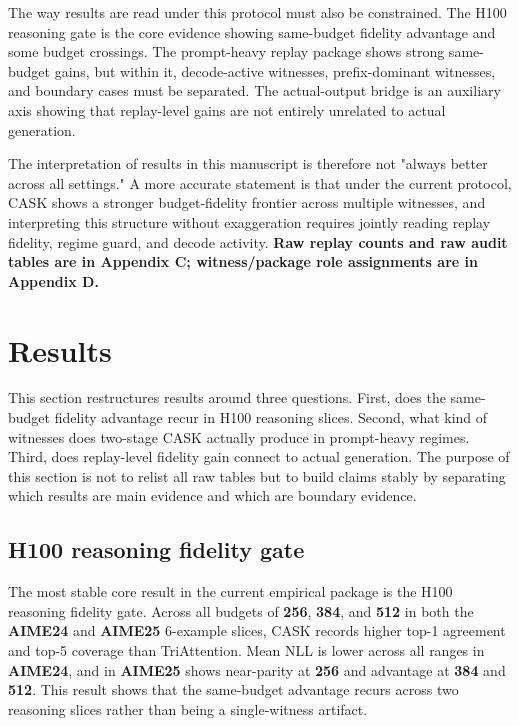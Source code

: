 The way results are read under this protocol must also be constrained. The H100 reasoning gate is the core evidence showing same-budget fidelity advantage and some budget crossings. The prompt-heavy replay package shows strong same-budget gains, but within it, decode-active witnesses, prefix-dominant witnesses, and boundary cases must be separated. The actual-output bridge is an auxiliary axis showing that replay-level gains are not entirely unrelated to actual generation.


The interpretation of results in this manuscript is therefore not "always better across all settings." A more accurate statement is that under the current protocol, CASK shows a stronger budget-fidelity frontier across multiple witnesses, and interpreting this structure without exaggeration requires jointly reading replay fidelity, regime guard, and decode activity. \textbf{Raw replay counts and raw audit tables are in Appendix C; witness/package role assignments are in Appendix D.}


\section{Results}


This section restructures results around three questions. First, does the same-budget fidelity advantage recur in H100 reasoning slices. Second, what kind of witnesses does two-stage CASK actually produce in prompt-heavy regimes. Third, does replay-level fidelity gain connect to actual generation. The purpose of this section is not to relist all raw tables but to build claims stably by separating which results are main evidence and which are boundary evidence.


\subsection{H100 reasoning fidelity gate}


The most stable core result in the current empirical package is the H100 reasoning fidelity gate. Across all budgets of \textbf{256}, \textbf{384}, and \textbf{512} in both the \textbf{AIME24} and \textbf{AIME25} 6-example slices, CASK records higher top-1 agreement and top-5 coverage than TriAttention. Mean NLL is lower across all ranges in \textbf{AIME24}, and in \textbf{AIME25} shows near-parity at \textbf{256} and advantage at \textbf{384} and \textbf{512}. This result shows that the same-budget advantage recurs across two reasoning slices rather than being a single-witness artifact.


